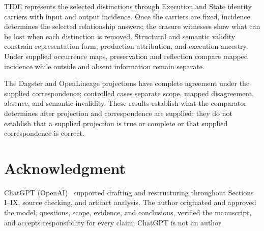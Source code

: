 \documentclass[conference]{IEEEtran}
\theoremstyle{tideproposition}
\begin{document}
TIDE represents the selected distinctions through Execution and State identity carriers with input and output incidence. Once the carriers are fixed, incidence determines the selected relationship answers; the erasure witnesses show what can be lost when each distinction is removed. Structural and semantic validity constrain representation form, production attribution, and execution ancestry. Under supplied occurrence maps, preservation and reflection compare mapped incidence while outside and absent information remain separate.

The Dagster and OpenLineage projections have complete agreement under the supplied correspondence; controlled cases separate scope, mapped disagreement, absence, and semantic invalidity. These results establish what the comparator determines after projection and correspondence are supplied; they do not establish that a supplied projection is true or complete or that supplied correspondence is correct.

\section*{Acknowledgment}
ChatGPT (OpenAI)~\cite{chatgpt} supported drafting and restructuring
throughout Sections I--IX, source checking, and artifact analysis.
The author originated and approved the model, questions, scope,
evidence, and conclusions, verified the manuscript, and accepts
responsibility for every claim; ChatGPT is not an author.
\end{document}
